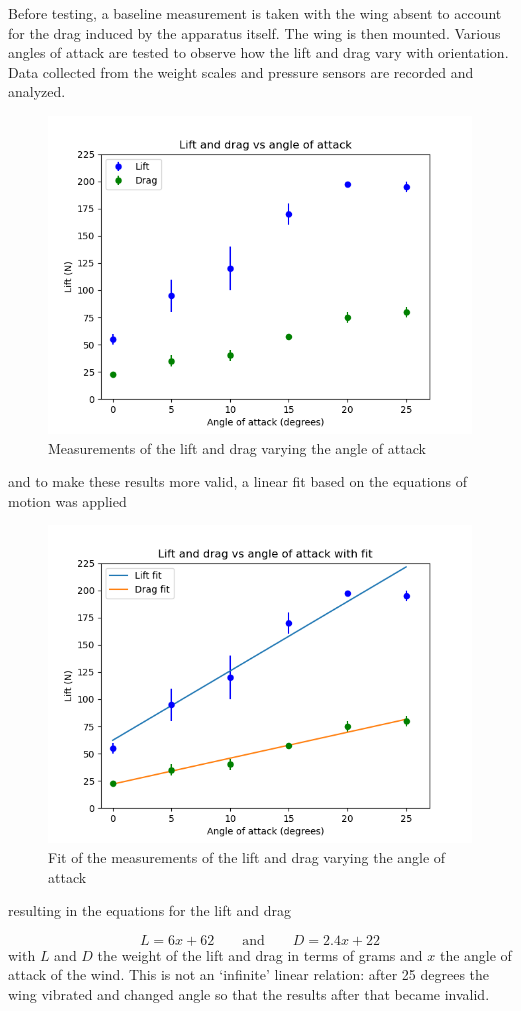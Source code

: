 Before testing, a baseline measurement is taken with the wing absent to account for the drag induced by the apparatus itself. The wing is then mounted. Various angles of attack are tested to observe how the lift and drag vary with orientation. Data collected from the weight scales and pressure sensors are recorded and analyzed.

\begin{figure}[h]
    \centering
    \includegraphics[width=0.5\linewidth]{images/windtunnel.png}
    \caption{Measurements of the lift and drag varying the angle of attack}
\end{figure}

\noindent and to make these results more valid, a linear fit based on the equations of motion was applied 

\begin{figure}[h]
    \centering
    \includegraphics[width=0.5\linewidth]{images/windtunnel_fit.png}
    \caption{Fit of the measurements of the lift and drag varying the angle of attack}
\end{figure}

\noindent resulting in the equations for the lift and drag

\begin{equation}
    L = 6x + 62 \qquad \text{and} \qquad D = 2.4x + 22
\end{equation}
with $L$ and $D$ the weight of the lift and drag in terms of grams and $x$ the angle of attack of the wind. This is not an `infinite' linear relation: after 25 degrees the wing vibrated and changed angle so that the results after that became invalid.

